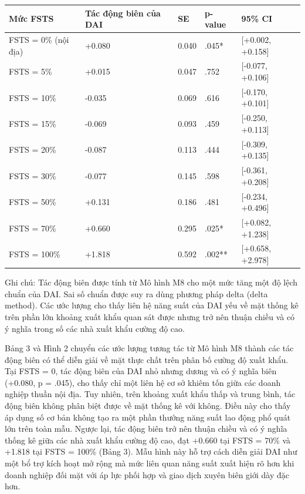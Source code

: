 \documentclass[12pt,a4paper]{article}
\begin{document}
\begin{longtable}[]{@{}lllll@{}}
\toprule\noalign{}
Mức FSTS & Tác động biên của DAI & SE & p-value & 95\% CI \\
\midrule\noalign{}
\endhead
\bottomrule\noalign{}
\endlastfoot
FSTS = 0\% (nội địa) & +0.080 & 0.040 & .045* & {[}+0.002, +0.158{]} \\
FSTS = 5\% & +0.015 & 0.047 & .752 & {[}-0.077, +0.106{]} \\
FSTS = 10\% & -0.035 & 0.069 & .616 & {[}-0.170, +0.101{]} \\
FSTS = 15\% & -0.069 & 0.093 & .459 & {[}-0.250, +0.113{]} \\
FSTS = 20\% & -0.087 & 0.113 & .444 & {[}-0.309, +0.135{]} \\
FSTS = 30\% & -0.077 & 0.145 & .598 & {[}-0.361, +0.208{]} \\
FSTS = 50\% & +0.131 & 0.186 & .481 & {[}-0.234, +0.496{]} \\
FSTS = 70\% & +0.660 & 0.295 & .025* & {[}+0.082, +1.238{]} \\
FSTS = 100\% & +1.818 & 0.592 & .002** & {[}+0.658, +2.978{]} \\
\end{longtable}

Ghi chú: Tác động biên được tính từ Mô hình M8 cho một mức tăng một độ
lệch chuẩn của DAI. Sai số chuẩn được suy ra dùng phương pháp delta
(delta method). Các ước lượng cho thấy liên hệ năng suất của DAI yếu về
mặt thống kê trên phần lớn khoảng xuất khẩu quan sát được nhưng trở nên
thuận chiều và có ý nghĩa trong số các nhà xuất khẩu cường độ cao.

Bảng 3 và Hình 2 chuyển các ước lượng tương tác từ Mô hình M8 thành các
tác động biên có thể diễn giải về mặt thực chất trên phân bố cường độ
xuất khẩu. Tại FSTS = 0, tác động biên của DAI nhỏ nhưng dương và có ý
nghĩa biên (+0.080, p = .045), cho thấy chỉ một liên hệ cơ sở khiêm tốn
giữa các doanh nghiệp thuần nội địa. Tuy nhiên, trên khoảng xuất khẩu
thấp và trung bình, tác động biên không phân biệt được về mặt thống kê
với không. Điều này cho thấy áp dụng số cơ bản không tạo ra một phần
thưởng năng suất lao động phổ quát lớn trên toàn mẫu. Ngược lại, tác
động biên trở nên thuận chiều và có ý nghĩa thống kê giữa các nhà xuất
khẩu cường độ cao, đạt +0.660 tại FSTS = 70\% và +1.818 tại FSTS = 100\%
(Bảng 3). Mẫu hình này hỗ trợ cách diễn giải DAI như một bổ trợ kích
hoạt mở rộng mà mức liên quan năng suất xuất hiện rõ hơn khi doanh
nghiệp đối mặt với áp lực phối hợp và giao dịch xuyên biên giới dày đặc
hơn.
\end{document}
